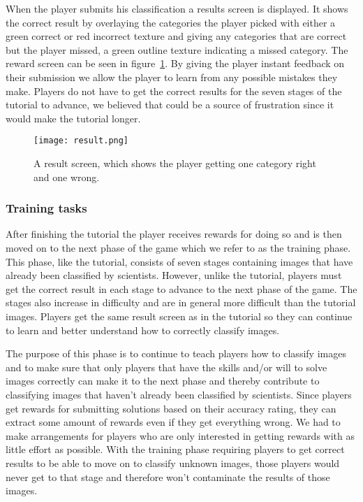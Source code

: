 When the player submits his classification a results screen is displayed. It shows the correct result by overlaying the categories the player picked with either a green correct or red incorrect texture and giving any categories that are correct but the player missed, a green outline texture indicating a missed category. The reward screen can be seen in figure~\ref{fig:result}. By giving the player instant feedback on their submission we allow the player to learn from any possible mistakes they make. Players do not have to get the correct results for the seven stages of the tutorial to advance, we believed that could be a source of frustration since it would make the tutorial longer. 

\begin{figure}[H]
\centering
\graphicspath{ {./graphics/} }
\centerline{\texttt{[image: result.png]}}
\caption{\label{fig:result}A result screen, which shows the player getting one category right and one wrong.}
\end{figure}

\subsubsection{Training tasks}
After finishing the tutorial the player receives rewards for doing so and is then moved on to the next phase of the game which we refer to as the training phase. This phase, like the tutorial, consists of seven stages containing images that have already been classified by scientists. However, unlike the tutorial, players must get the correct result in each stage to advance to the next phase of the game. The stages also increase in difficulty and are in general more difficult than the tutorial images. Players get the same result screen as in the tutorial so they can continue to learn and better understand how to correctly classify images. 

The purpose of this phase is to continue to teach players how to classify images and to make sure that only players that have the skills and/or will to solve images correctly can make it to the next phase and thereby contribute to classifying images that haven't already been classified by scientists. Since players get rewards for submitting solutions based on their accuracy rating, they can extract some amount of rewards even if they get everything wrong. We had to make arrangements for players who are only interested in getting rewards with as little effort as possible. With the training phase requiring players to get correct results to be able to move on to classify unknown images, those players would never get to that stage and therefore won't contaminate the results of those images.

